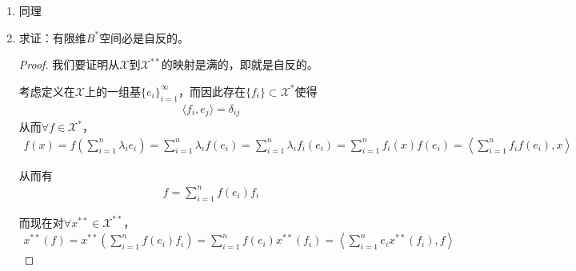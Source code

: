 \begin{enumerate}[leftmargin=2cm, label=\arabic*]
		\begin{proof}
			注意对于$\forall x\in C$，$x = \{\xi_k\}$，考虑$\lim\limits_{k\to\infty} \xi_k = \xi_0$，则
			\begin{align*}
				x = \xi_0 e_0 + \sum\limits_{k=1}^{\infty} (\xi_k - \xi_0) e_k
			\end{align*}
			其中
			\begin{align*}
				e_0 &= (1,1,1,\cdots, 1,\cdots,1); \\
				e_k &= (\underbrace{0,0,\cdots,1}\limits_{k},0,\cdots, 0).
			\end{align*}
			对于$\forall f\in C^*$，记
			\begin{align*}
				f(x) &= \xi_0 f(e_0) + \sum\limits_{k=1}^{\infty} (\xi_k - \xi_0) f(e_k) \\
				\Tilde{\eta}_0 &= f(e_0) \\
				\Tilde{\eta}_k &= f(e_k) 
			\end{align*}
			则有
			\begin{align*}
				f(x) = \xi_0 \Tilde{\eta}_0 + \sum\limits_{k=1}^{\infty} (\xi_k - \xi_0)\Tilde{\eta}_k
			\end{align*}
			而后证明这两个范数相等即可。
		\end{proof} 
		
		\item 同理
		
		\item 求证：有限维$B^*$空间必是自反的。
		\begin{proof}
			我们要证明从$\mathscr{X}$到$\mathscr{X}^{**}$的映射是满的，即就是自反的。
			
			考虑定义在$\mathscr{X}$上的一组基$\{e_i\}_{i=1}^{\infty}$，而因此存在$\{f_i\}\subset\mathscr{X}^*$使得
			\begin{align*}
				\langle f_i, e_j\rangle = \delta_{ij}
			\end{align*}
			从而$\forall f\in\mathscr{X}^*$，
			\begin{align*}
				f(x) = f\left(\sum\limits_{i=1}^n \lambda_i e_i\right) = \sum\limits_{i=1}^n \lambda_i f(e_i) = \sum\limits_{i=1}^n \lambda_i f_i(e_i) = \sum\limits_{i=1}^n f_i(x) f(e_i) = \left\langle \sum\limits_{i=1}^n f_i f(e_i) , x\right\rangle
			\end{align*}
			
			从而有
			\begin{align*}
				f = \sum\limits_{i=1}^n  f(e_i)f_i
			\end{align*}
			
			而现在对$\forall x^{**}\in\mathscr{X}^{**}$，
			\begin{align*}
				x^{**}(f) = x^{**}\left(\sum\limits_{i=1}^n  f(e_i)f_i\right) = \sum\limits_{i=1}^n  f(e_i)x^{**}(f_i) = \left\langle \sum\limits_{i=1}^n  e_i x^{**}(f_i), f \right\rangle 
			\end{align*}
			

\end{proof}
\end{enumerate}
